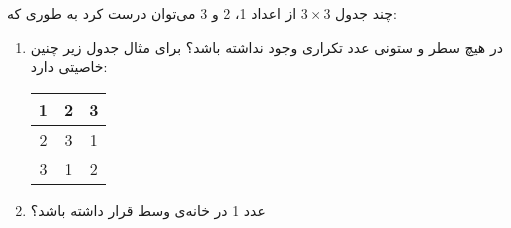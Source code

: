 \p
چند جدول
$3 \times 3$
از اعداد 1، 2 و 3 می‌توان درست کرد به طوری که:
\begin{enumerate}
    \item 
    در هیچ سطر و ستونی عدد تکراری وجود نداشته باشد؟ برای مثال جدول زیر چنین خاصیتی دارد:
    \vspace*{+0.4cm}
    \begin{center}
    \begin{tabular}{ |c|c|c| } 
     \hline
     1 & 2 & 3 \\ 
     \hline
     2 & 3 & 1 \\ 
     \hline
     3 & 1 & 2 \\ 
     \hline
    \end{tabular}
    \end{center}
    \vspace*{+0.4cm}
   \item
    عدد 1 در خانه‌ی وسط قرار داشته باشد؟
\end{enumerate}
